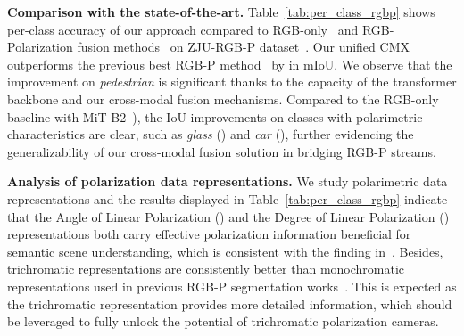 \documentclass[journal]{IEEEtran}
\begin{document}
\noindent\textbf{Comparison with the state-of-the-art.}
Table~\ref{tab:per_class_rgbp} shows per-class accuracy of our approach compared to RGB-only~\cite{xie2021segformer,orsic2019swiftnet} and RGB-Polarization fusion methods~\cite{xiang2021polarization,yan2021nlfnet} on ZJU-RGB-P dataset~\cite{xiang2021polarization}.
Our unified CMX outperforms the previous best RGB-P method~\cite{xiang2021polarization} by  in mIoU.
We observe that the improvement on \emph{pedestrian} is significant thanks to the capacity of the transformer backbone and our cross-modal fusion mechanisms.
Compared to the RGB-only baseline with MiT-B2~\cite{xie2021segformer}), the IoU improvements on classes with polarimetric characteristics are clear, such as \emph{glass} () and \emph{car} (), further evidencing the generalizability of our cross-modal fusion solution in bridging RGB-P streams.

\noindent\textbf{Analysis of polarization data representations.}
We study polarimetric data representations and the results displayed in Table~\ref{tab:per_class_rgbp} indicate that the Angle of Linear Polarization () and the Degree of Linear Polarization () representations both carry effective polarization information beneficial for semantic scene understanding, which is consistent with the finding in~\cite{xiang2021polarization}.
Besides, trichromatic representations are consistently better than monochromatic representations used in previous RGB-P segmentation works~\cite{xiang2021polarization,yan2021nlfnet}.
This is expected as the trichromatic representation provides more detailed information, which should be leveraged to fully unlock the potential of trichromatic polarization cameras.
\end{document}
